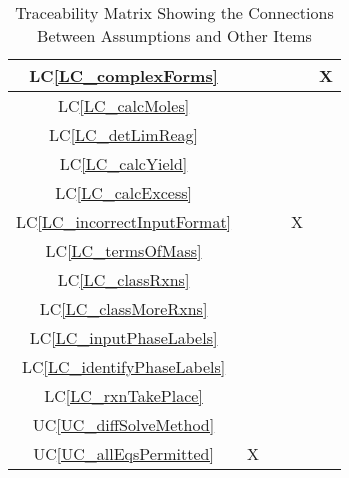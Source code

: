 \documentclass[12pt]{article}
\newcommand{\lcref}[1]{LC\ref{#1}}
\newcommand{\ucref}[1]{UC\ref{#1}}
\begin{document}
\begin{table}[h!]
{\begin{tabular}{|c|c|c|c|c|}
      \lcref{LC_complexForms}         &                       &                     &                             & X                    \\ \hline
      \lcref{LC_calcMoles}            &                       &                     &                             &                      \\ \hline
      \lcref{LC_detLimReag}           &                       &                     &                             &                      \\ \hline
      \lcref{LC_calcYield}            &                       &                     &                             &                      \\ \hline
      \lcref{LC_calcExcess}           &                       &                     &                             &                      \\ \hline
      \lcref{LC_incorrectInputFormat} &                       &                     & X                           &                      \\ \hline
      \lcref{LC_termsOfMass}          &                       &                     &                             &                      \\ \hline
      \lcref{LC_classRxns}            &                       &                     &                             &                      \\ \hline
      \lcref{LC_classMoreRxns}        &                       &                     &                             &                      \\ \hline
      \lcref{LC_inputPhaseLabels}     &                       &                     &                             &                      \\ \hline
      \lcref{LC_identifyPhaseLabels}  &                       &                     &                             &                      \\ \hline
      \lcref{LC_rxnTakePlace}         &                       &                     &                             &                      \\ \hline
      \ucref{UC_diffSolveMethod}      &                       &                     &                             &                      \\ \hline
      \ucref{UC_allEqsPermitted}      & X                     &                     &                             &                      \\ \hline
    \end{tabular}
    \caption{Traceability Matrix Showing the Connections Between Assumptions and Other Items}
    \label{Table:A_trace}
  }
\end{table}
\end{document}
